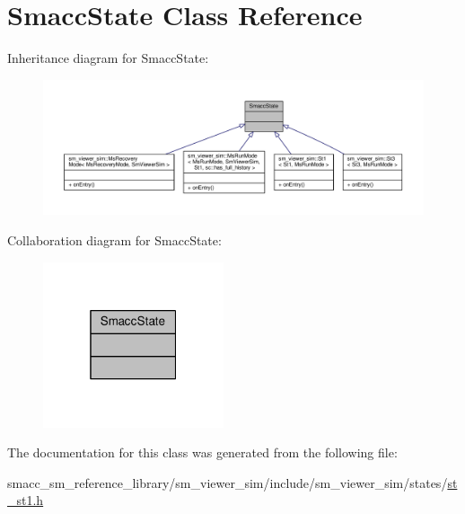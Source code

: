 \hypertarget{classSmaccState}{}\section{Smacc\+State Class Reference}
\label{classSmaccState}


Inheritance diagram for Smacc\+State\+:\nopagebreak
\begin{figure}[H]
\begin{center}
\leavevmode
\includegraphics[width=350pt]{classSmaccState__inherit__graph}
\end{center}
\end{figure}


Collaboration diagram for Smacc\+State\+:\nopagebreak
\begin{figure}[H]
\begin{center}
\leavevmode
\includegraphics[width=151pt]{classSmaccState__coll__graph}
\end{center}
\end{figure}


The documentation for this class was generated from the following file\+:\begin{DoxyCompactItemize}
\item 
smacc\+\_\+sm\+\_\+reference\+\_\+library/sm\+\_\+viewer\+\_\+sim/include/sm\+\_\+viewer\+\_\+sim/states/\hyperlink{st__st1_8h}{st\+\_\+st1.\+h}\end{DoxyCompactItemize}
